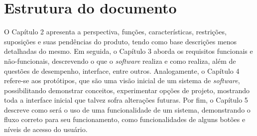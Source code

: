 \section{Estrutura do documento}

O Capítulo 2 apresenta a perspectiva, funções, características, restrições, suposições e suas pendências do produto, tendo como base descrições menos detalhadas do mesmo. Em seguida, o Capítulo 3 aborda os requisitos funcionais e não-funcionais, descrevendo o que o \textit{software} realiza e como realiza, além de questões de desempenho, interface, entre outros. Analogamente, o Capítulo 4 refere-se aos protótipos, que são uma visão inicial de um sistema de \textit{software}, possibilitando demonstrar conceitos, experimentar opções de projeto, mostrando toda a interface inicial que talvez sofra alterações futuras. Por fim, o Capítulo 5 descreve como será o uso de uma funcionalidade de um sistema, demonstrando o fluxo correto para seu funcionamento, como funcionalidades de alguns botões e níveis de acesso do usuário.